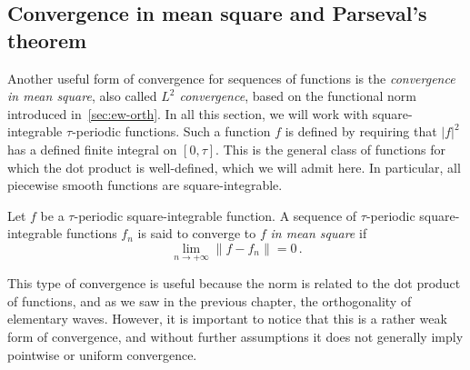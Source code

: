 \subsection{Convergence in mean square and Parseval's theorem}
Another useful form of convergence for sequences of functions is the \emph{convergence in
mean square}, also called \emph{$L^2$ convergence}, based on the functional norm
introduced in~\cref{sec:ew-orth}. In all this section, we will work with square-integrable
$\tau$-periodic functions. Such a function $f$ is defined by requiring that $|f|^2$ has a
defined finite integral on $[0,\tau]$. This is the general class of functions for which
the dot product is well-defined, which we will admit here. In particular, all piecewise
smooth functions are square-integrable.
\begin{definition}
  Let $f$ be a $\tau$-periodic square-integrable function. A sequence of $\tau$-periodic
  square-integrable functions $f_n$ is said to converge to $f$ \emph{in mean square} if
  \begin{equation}
    \lim_{n\to+\infty}\|f-f_n\|=0\,.
  \end{equation}
\end{definition}
This type of convergence is useful because the norm is related to the dot product of
functions, and as we saw in the previous chapter, the orthogonality of elementary waves.
However, it is important to notice that this is a rather weak form of convergence, and
without further assumptions it does not generally imply pointwise or uniform convergence.

